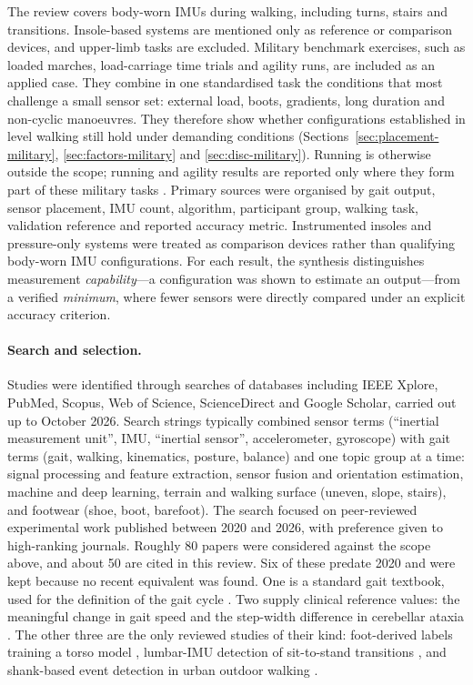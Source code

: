 \documentclass[10pt,a4paper,twocolumn]{article}
\begin{document}
The review covers body-worn IMUs during walking, including turns, stairs and transitions. Insole-based systems are mentioned only as reference or comparison devices, and upper-limb tasks are excluded. Military benchmark exercises, such as loaded marches, load-carriage time trials and agility runs, are included as an applied case. They combine in one standardised task the conditions that most challenge a small sensor set: external load, boots, gradients, long duration and non-cyclic manoeuvres. They therefore show whether configurations established in level walking still hold under demanding conditions (Sections~\ref{sec:placement-military}, \ref{sec:factors-military} and \ref{sec:disc-military}). Running is otherwise outside the scope; running and agility results are reported only where they form part of these military tasks \citep{fain2024a,fain2024b,papadakis2023,kessels2021}. Primary sources were organised by gait output, sensor placement, IMU count, algorithm, participant group, walking task, validation reference and reported accuracy metric. Instrumented insoles and pressure-only systems were treated as comparison devices rather than qualifying body-worn IMU configurations. For each result, the synthesis distinguishes measurement \emph{capability}---a configuration was shown to estimate an output---from a verified \emph{minimum}, where fewer sensors were directly compared under an explicit accuracy criterion.

\paragraph{Search and selection.} Studies were identified through searches of databases including IEEE Xplore, PubMed, Scopus, Web of Science, ScienceDirect and Google Scholar, carried out up to October 2026. Search strings typically combined sensor terms (``inertial measurement unit'', IMU, ``inertial sensor'', accelerometer, gyroscope) with gait terms (gait, walking, kinematics, posture, balance) and one topic group at a time: signal processing and feature extraction, sensor fusion and orientation estimation, machine and deep learning, terrain and walking surface (uneven, slope, stairs), and footwear (shoe, boot, barefoot). The search focused on peer-reviewed experimental work published between 2020 and 2026, with preference given to high-ranking journals. Roughly 80 papers were considered against the scope above, and about 50 are cited in this review. Six of these predate 2020 and were kept because no recent equivalent was found. One is a standard gait textbook, used for the definition of the gait cycle \citep{perry2010}. Two supply clinical reference values: the meaningful change in gait speed \citep{perera2006} and the step-width difference in cerebellar ataxia \citep{buckley2018}. The other three are the only reviewed studies of their kind: foot-derived labels training a torso model \citep{koroglu2018}, lumbar-IMU detection of sit-to-stand transitions \citep{pham2018}, and shank-based event detection in urban outdoor walking \citep{storm2016}.
\end{document}
